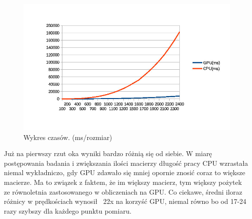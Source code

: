 \documentclass[a4paper,12pt,oneside]{article}
\begin{document}
\begin{figure}[H]
  \caption{Wykres czasów. (ms/rozmiar)}
  \centering
    \includegraphics[width=1.2\textwidth]{wykres}
\end{figure}

Już na pierwszy rzut oka wyniki bardzo różnią się od siebie. W miarę postępowania badania i zwiększania ilości macierzy długość pracy CPU wzrastała niemal wykładniczo, gdy GPU zdawało się mniej opornie znosić coraz to większe macierze. Ma to związek  z faktem, że im większy macierz, tym większy pożytek ze równoletnia zastosowanego w obliczeniach na GPU. Co ciekawe, średni iloraz różnicy w  prędkościach wynosił ~22x na korzyść GPU, niemal równo bo od 17-24 razy szybszy dla każdego punktu pomiaru.
\end{document}
